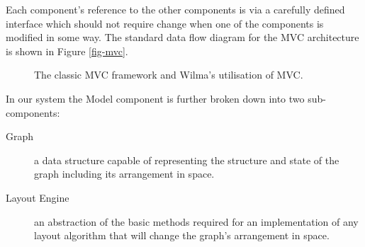 \documentclass[runningheads]{cl2emult}
\begin{document}
Each component's reference to
the other components is via a carefully defined interface which should
not require change when one of the components is modified in some way.  The
standard data flow diagram for the MVC architecture is shown in Figure
\ref{fig-mvc}.

\begin{figure}[h]
  \centering
  \caption{The classic MVC framework and Wilma's utilisation of MVC.}
\end{figure}

In our system the Model component is further broken down into two sub-components:
\begin{description}
\item[Graph] a data structure capable of representing the structure
and state of the graph including its arrangement in space.
\item[Layout Engine] an abstraction of the basic methods required for
an implementation of any layout algorithm that will change the graph's
arrangement in space.
\end{description}
\end{document}

